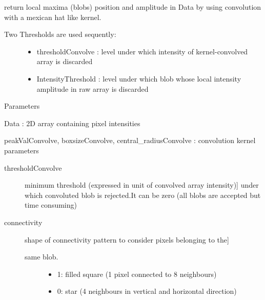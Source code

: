 \documentclass[letterpaper,10pt,english]{sphinxmanual}
\begin{document}
\begin{fulllineitems}
\label{\detokenize{PeakSearch:LaueTools.readmccd.LocalMaxima_KernelConvolution}}
return local maxima (blobs) position and amplitude in Data by using
convolution with a mexican hat like kernel.
\begin{description}
\item[{Two Thresholds are used sequently:}] \leavevmode\begin{itemize}
\item {} 
thresholdConvolve : level under which intensity of kernel-convolved array is discarded

\item {} 
IntensityThreshold : level under which blob whose local intensity amplitude in raw array is discarded

\end{itemize}

\end{description}

Parameters

Data : 2D array containing pixel intensities

peakValConvolve, boxsizeConvolve, central\_radiusConvolve : convolution kernel parameters
\begin{description}
\item[{thresholdConvolve}] \leavevmode{[}minimum threshold (expressed in unit of convolved array intensity){]}
under which convoluted blob is rejected.It can be zero
(all blobs are accepted but time consuming)

\item[{connectivity}] \leavevmode{[}shape of connectivity pattern to consider pixels belonging to the{]}\begin{description}
\item[{same blob.}] \leavevmode\begin{itemize}
\item {} 
1: filled square  (1 pixel connected to 8 neighbours)

\item {} 
0: star (4 neighbours in vertical and horizontal direction)


\end{itemize}
\end{description}
\end{description}
\end{fulllineitems}
\end{document}
